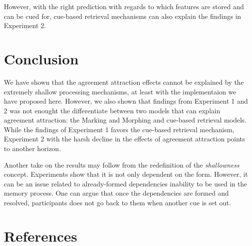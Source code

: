 \documentclass[doc]{apa6}
\begin{document}
However, with the right prediction with regards to which features are stored and can be cued for, cue-based retrieval mechanisms can also explain the findings in Experiment 2.

\hypertarget{conclusion}{%
\section{Conclusion}\label{conclusion}}

We have shown that the agreement attraction effects cannot be explained by the extremely shallow processing mechanisms, at least with the implementaion we have proposed here. However, we also shown that findings from Experiment 1 and 2 was not enought the differentiate between two models that can explain agreement attraction: the Marking and Morphing and cue-based retrieval models. While the findings of Experiment 1 favors the cue-based retrieval mechanism, Experiment 2 with the harsh decline in the effects of agreement attraction points to another horizon.

Another take on the results may follow from the redefinition of the \emph{shallowness} concept. Experiments show that it is not only dependent on the form. However, it can be an issue related to already-formed dependencies inability to be used in the memory process. One can argue that once the dependencies are formed and resolved, participants does not go back to them when another cue is set out.

\hypertarget{references}{%
\section{References}\label{references}}

\begingroup
\setlength{\parindent}{-0.5in}
\setlength{\leftskip}{0.5in}

\hypertarget{refs}{}

\endgroup

\printbibliography
\end{document}
